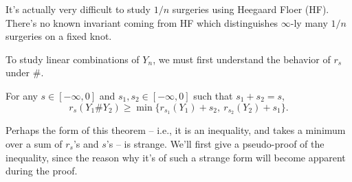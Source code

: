 \documentclass[main]{subfiles}
\begin{document}
\begin{remark}
It's actually very difficult to study $1/n$ surgeries using Heegaard Floer (HF). There's no known invariant coming from HF which distinguishes $\infty$-ly many $1/n$ surgeries on a fixed knot.
\end{remark}

To study linear combinations of $Y_n$, we must first understand the behavior of $r_s$ under $\#$.

\begin{theorem}
For any $s\in[-\infty,0]$ and $s_1,s_2\in[-\infty,0]$ such that $s_1+s_2=s$,
\[
r_s(Y_1\#Y_2) \geq \min\{r_{s_1}(Y_1)+s_2,\ r_{s_2}(Y_2)+s_1\}.
\]
\end{theorem}

Perhaps the form of this theorem -- i.e., it is an inequality, and takes a minimum over a sum of $r_s$'s and $s$'s -- is strange. We'll first give a pseudo-proof of the inequality, since the reason why it's of such a strange form will become apparent during the proof.
\end{document}
